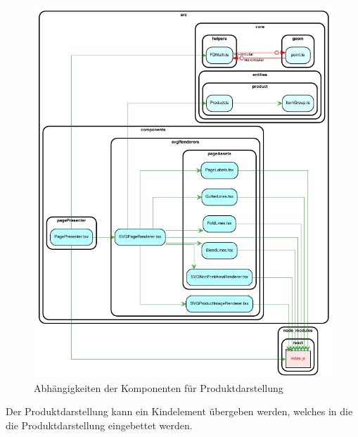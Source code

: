 \begin{figure}[H]
    \centering
    \includegraphics{diagrams/Ist-Architektur/page-presenter-analysis.pdf}
    \caption{Abhängigkeiten der Komponenten für Produktdarstellung}
    \label{fig:Produktdarstellung}
\end{figure}

Der Produktdarstellung kann ein Kindelement übergeben werden, welches in die die Produktdarstellung eingebettet werden. 


\begin{multicols}{2}
    
\end{multicols}